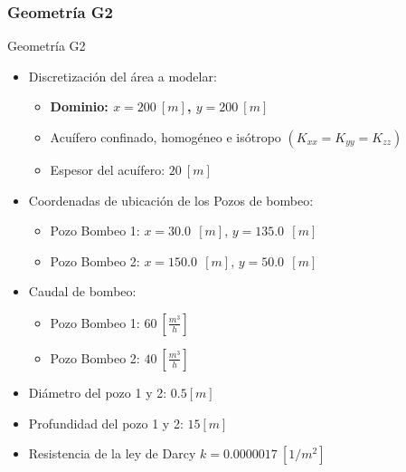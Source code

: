 \documentclass[spanish]{beamer}
\begin{document}
\subsubsection{Geometría G2}
\begin{frame}{Geometría G2}
\begin{itemize}
	\item Discretización del área a modelar:	
	\begin{itemize}
		\item \textbf{Dominio: $x=200 ~\left[m\right]$, $y=200 ~\left[m\right]$}
		\item Acuífero confinado, homogéneo e isótropo $(K_{xx} = K_{yy} = K_{zz})$
		\item Espesor del acuífero: $20 ~\left[m\right]$
	\end{itemize}
	\item Coordenadas de ubicación de los Pozos de bombeo:
	\begin{itemize}
		\item Pozo Bombeo 1: $x=30.0 ~~\left[m\right]$, $y=135.0 ~~\left[m\right]$
		\item Pozo Bombeo 2: $x=150.0~~\left[m\right]$, $y=50.0 ~~\left[m\right]$
	\end{itemize}
	\item Caudal de bombeo:
	\begin{itemize}
		\item Pozo Bombeo 1: $60~\left[\frac{m^3}{h}\right]$
		\item Pozo Bombeo 2: $40~\left[\frac{m^3}{h}\right]$
	\end{itemize}
	\item Diámetro del pozo 1 y 2: $0.5 [m]$
	\item Profundidad del pozo 1 y 2: $15 [m]$
	\item Resistencia de la ley de Darcy $k=0.0000017~[1/m^2]$
\end{itemize}
\end{frame}
%
\end{document}
